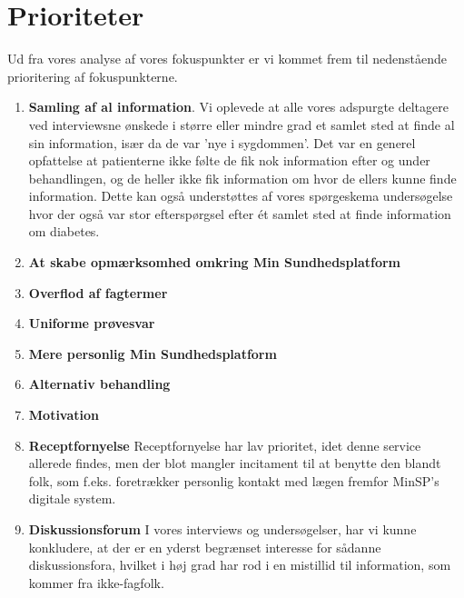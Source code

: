 \section{Prioriteter}
Ud fra vores analyse af vores fokuspunkter er vi kommet frem til nedenstående prioritering af fokuspunkterne.\\
\begin{enumerate}
	\item \textbf{Samling af al information}. Vi oplevede at alle vores adspurgte deltagere ved interviewsne ønskede i større eller mindre grad et samlet sted at finde al sin information, især da de var 'nye i sygdommen'. Det var en generel opfattelse at patienterne ikke følte de fik nok information efter og under behandlingen, og de heller ikke fik information om hvor de ellers kunne finde information. Dette kan også understøttes af vores spørgeskema undersøgelse hvor der også var stor efterspørgsel efter ét samlet sted at finde information om diabetes.
	\item \textbf{At skabe opmærksomhed omkring Min Sundhedsplatform}
	\item \textbf{Overflod af fagtermer}
	\item \textbf{Uniforme prøvesvar}
	\item \textbf{Mere personlig Min Sundhedsplatform}
	\item \textbf{Alternativ behandling}
	\item \textbf{Motivation}
	\item \textbf{Receptfornyelse}
        Receptfornyelse har lav prioritet, idet denne service allerede findes, men der blot mangler incitament til at benytte den blandt folk, som f.eks. foretrækker personlig kontakt med lægen fremfor MinSP's digitale system.
	\item \textbf{Diskussionsforum}
        I vores interviews og undersøgelser, har vi kunne konkludere, at der er en yderst begrænset interesse for sådanne diskussionsfora, hvilket i høj grad har rod i en mistillid til information, som kommer fra ikke-fagfolk.
\end{enumerate}
